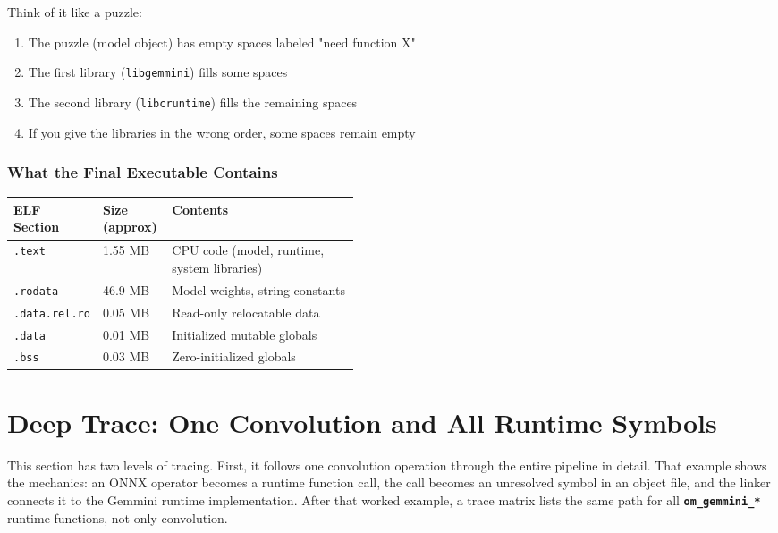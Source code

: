 \documentclass[12pt,a4paper]{article}
\newcommand{\cmd}[1]{\textcolor{argblue}{\texttt{\textbf{#1}}}}
\begin{document}
\begin{analogyenv}
Think of it like a puzzle:
\begin{enumerate}
  \item The puzzle (model object) has empty spaces labeled "need function X"
  \item The first library (\texttt{libgemmini}) fills some spaces
  \item The second library (\texttt{libcruntime}) fills the remaining spaces
  \item If you give the libraries in the wrong order, some spaces remain empty
\end{enumerate}
\end{analogyenv}

\subsubsection{What the Final Executable Contains}

\begin{table}[H]
\centering
\small
\begin{tabularx}{\linewidth}{@{}L{0.25\linewidth}L{0.20\linewidth}Y@{}}
\toprule
\textbf{ELF Section} & \textbf{Size (approx)} & \textbf{Contents} \\
\midrule
\texttt{.text} & 1.55 MB & CPU code (model, runtime, system libraries) \\
\texttt{.rodata} & 46.9 MB & Model weights, string constants \\
\texttt{.data.rel.ro} & 0.05 MB & Read-only relocatable data \\
\texttt{.data} & 0.01 MB & Initialized mutable globals \\
\texttt{.bss} & 0.03 MB & Zero-initialized globals \\
\bottomrule
\end{tabularx}
\end{table}

\section{Deep Trace: One Convolution and All Runtime Symbols}

This section has two levels of tracing. First, it follows one convolution
operation through the entire pipeline in detail. That example shows the mechanics:
an ONNX operator becomes a runtime function call, the call becomes an unresolved
symbol in an object file, and the linker connects it to the Gemmini runtime
implementation. After that worked example, a trace matrix lists the same path for
all \cmd{om\_gemmini\_*} runtime functions, not only convolution.
\end{document}
